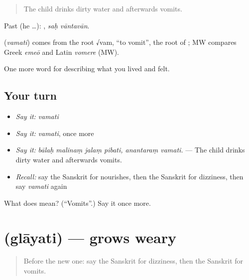 \begin{quote}
The child drinks dirty water and afterwards vomits.
\end{quote}

Past (he …):  , \emph{saḥ vāntavān}.

\begin{cousinweb}
\textbf{} (\emph{vamati}) comes from the root √vam, \textquotedblleft{}to vomit\textquotedblright{}, the root of \textbf{}; MW compares Greek \emph{emeō} and Latin \emph{vomere} (MW).
\end{cousinweb}

\begin{grammarlens}[title={What you've built}]
One more word for describing what you lived and felt.
\end{grammarlens}

\subsection*{Your turn}
\begin{itemize}
\raggedright
  \item \emph{Say it:} \emph{vamati}
  \item \emph{Say it:} \emph{vamati}, once more
  \item \emph{Say it:} \emph{bālaḥ malinaṃ jalaṃ pibati, anantaraṃ vamati.} — The child drinks dirty water and afterwards vomits.
  \item \emph{Recall:} say the Sanskrit for nourishes, then the Sanskrit for dizziness, then say \emph{vamati} again
\end{itemize}

\begin{tcolorbox}[breakable,colback=teal!4,colframe=teal!35!black,title={Before you move on}]
What does  mean? (\textquotedblleft{}Vomits\textquotedblright{}.) Say it once more.
\end{tcolorbox}
\section[\texorpdfstring{\sk{ग्लायति} (glāyati)}{ग्लायति (glāyati)}]{ (glāyati) — grows weary}

\label{lesson:SA-C477-glayati}



\begin{quote}
Before the new one: say the Sanskrit for dizziness, then the Sanskrit for vomits.
\end{quote}


